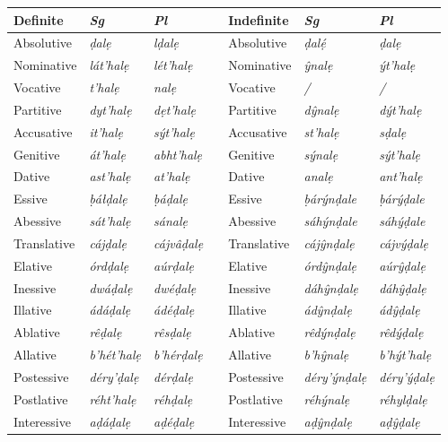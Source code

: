 \documentclass[a4paper, 12pt, twoside, final]{article}
\let \nf \normalfont
\begin{document}
\noindent\begin{longtable}{l|>{\it}l|>{\it}lll|>{\it}l|>{\it}l}
Definite    &\nf Sg&\nf Pl && Indefinite&\nf Sg&\nf Pl\\\cline{1-3}\cline{5-7}
\endhead
Absolutive    & ḍalẹ         & lḍalẹ      && Absolutive    & ḍalẹ́            & ḍalẹ        \\
Nominative    & lát’halẹ     & lét’halẹ   && Nominative    & ŷnalẹ           & ýt’halẹ     \\
Vocative      & t’halẹ       & nalẹ       && Vocative      & /               & /           \\
Partitive     & dyt’halẹ     & dẹt’halẹ   && Partitive     & dŷnalẹ          & dýt’halẹ    \\
Accusative    & it’halẹ      & sýt’halẹ   && Accusative    & st’halẹ         & sḍalẹ       \\
Genitive      & át’halẹ      & abht’halẹ  && Genitive      & sýnalẹ          & sýt’halẹ    \\
Dative        & ast’halẹ     & at’halẹ    && Dative        & analẹ           & ant’halẹ    \\
Essive        & ḅáłḍalẹ      & ḅáḍalẹ     && Essive        & ḅárýnḍale       & ḅárýḍale    \\
Abessive      & sát’halẹ     & sánalẹ     && Abessive      & sáhýnḍale       & sáhýḍale    \\
Translative   & cájḍalẹ      & cájvâḍalẹ  && Translative   & cájŷnḍalẹ       & cájvýḍalẹ   \\
Elative       & órdḍalẹ      & aúrḍalẹ    && Elative       & órdŷnḍalẹ       & aúrŷḍalẹ    \\
Inessive      & dwáḍalẹ      & dwéḍalẹ    && Inessive      & dáhŷnḍalẹ       & dáhŷḍalẹ    \\
Illative      & ádáḍalẹ      & ádéḍalẹ    && Illative      & ádŷnḍalẹ        & ádŷḍalẹ     \\
Ablative      & rêḍalẹ       & rêsḍalẹ    && Ablative      & rêdýnḍalẹ       & rêdýḍalẹ    \\
Allative      & b’hét’halẹ   & b’hérḍalẹ  && Allative      & b’hŷnalẹ        & b’hýt’halẹ  \\
Postessive    & déry’ḍalẹ    & dérḍalẹ    && Postessive    & déry’ýnḍalẹ     & déry’ýḍalẹ  \\
Postlative    & réht’halẹ    & réhḍalẹ    && Postlative    & réhýnalẹ        & réhylḍalẹ   \\
Interessive   & aḍáḍalẹ      & aḍéḍalẹ    && Interessive   & aḍŷnḍalẹ        & aḍŷḍalẹ     \\

\end{longtable}
\end{document}
